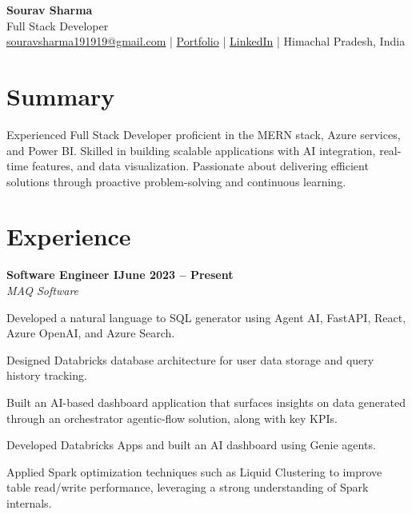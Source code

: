 \documentclass[a4paper,10pt]{article}
\newcommand{\entry}[4]{%
  \noindent\textbf{#1}\hfill\textbf{#2}\\
  \textit{\color{muted}#3}\hfill\textit{\color{muted}#4}%
}
\begin{document}
\small

\begin{center}
  {\Huge\bfseries\color{black} Sourav Sharma}\\[3pt]
  {\large\color{accent} Full Stack Developer}\\[5pt]
  {\small
  \href{mailto:souravsharma191919@gmail.com}{souravsharma191919@gmail.com}
  \quad\textcolor{rule}{|}\quad
  \href{https://souravsharma.online}{Portfolio}
  \quad\textcolor{rule}{|}\quad
  \href{https://linkedin.com/in/sourav-sharma}{LinkedIn}
  \quad\textcolor{rule}{|}\quad
  Himachal Pradesh, India
  }
\end{center}

\section{Summary}
Experienced Full Stack Developer proficient in the MERN stack, Azure services, and Power BI. Skilled in building
scalable applications with AI integration, real-time features, and data visualization. Passionate about delivering
efficient solutions through proactive problem-solving and continuous learning.

\section{Experience}

\entry{Software Engineer I}{June 2023 -- Present}{MAQ Software}{}

\vspace{2pt}
\begin{tight}
  \item Developed a natural language to SQL generator using Agent AI, FastAPI, React, Azure OpenAI, and Azure Search.
  \item Designed Databricks database architecture for user data storage and query history tracking.
  \item Built an AI-based dashboard application that surfaces insights on data generated through an orchestrator agentic-flow solution, along with key KPIs.
  \item Developed Databricks Apps and built an AI dashboard using Genie agents.
  \item Applied Spark optimization techniques such as Liquid Clustering to improve table read/write performance, leveraging a strong understanding of Spark internals.
\end{tight}
\end{document}
